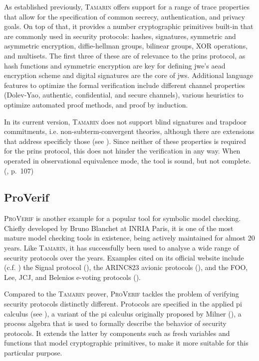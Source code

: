 As established previously, \textsc{Tamarin} offers support for a range of trace properties that allow for the specification of common secrecy, authentication, and privacy goals.
On top of that, it provides a number cryptographic primitives built-in that are commonly used in security protocols: hashes, signatures, symmetric and asymmetric encryption, diffie-hellman groups, bilinear groups, XOR operations, and multisets.
The first three of these are of relevance to the \gls{prins} protocol, as hash functions and symmetric encryption are key for defining \gls{jwe}'s \gls{aead} encryption scheme and digital signatures are the core of \gls{jws}.
Additional language features to optimize the formal verification include different channel properties (Dolev-Yao, authentic, confidential, and secure channels), various heuristics to optimize automated proof methods, and proof by induction.

In its current version, \textsc{Tamarin} does not support blind signatures and trapdoor commitments, i.e. non-subterm-convergent theories, although there are extensions that address specificly those (see \cite{dreier2017beyond}).
Since neither of these properties is required for the \gls{prins} protocol, this does not hinder the verification in any way.
When operated in observational equivalence mode, the tool is sound, but not complete. (\cite{tamarin2019manual}, p.~107)

\subsection{ProVerif}
\label{ssec:proverif}

\textsc{ProVerif} is another example for a popular tool for symbolic model checking.
Chiefly developed by Bruno Blanchet at INRIA Paris, it is one of the most mature model checking tools in existence, being actively maintained for almost 20 years.
Like \textsc{Tamarin}, it has successfully been used to analyse a wide range of security protocols over the years.
Examples cited on its official website include (c.f. \cite{proverif}) the Signal protocol (\cite{kobeissi2017automated}), the ARINC823 avionic protocols (\cite{blanchet2017symbolic}), and the FOO, Lee, JCJ, and Belenios e-voting protocols (\cite{hirschi2019improving}).

Compared to the \textsc{Tamarin} prover, \textsc{ProVerif} tackles the problem of verifying security protocols distinctly different.
Protocols are specified in the applied pi calculus (see \cite{abadi2017applied}), a variant of the pi calculus originally proposed by Milner (\cite{milner1999communicating}), a process algebra that is used to formally describe the behavior of security protocols.
It extends the latter by components such as fresh variables and functions that model cryptographic primitives, to make it more suitable for this particular purpose.

